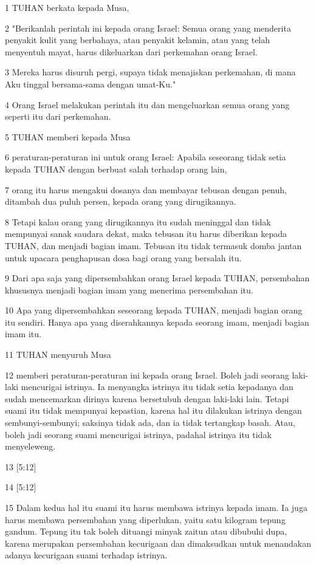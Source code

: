 \par 1 TUHAN berkata kepada Musa,
\par 2 "Berikanlah perintah ini kepada orang Israel: Semua orang yang menderita penyakit kulit yang berbahaya, atau penyakit kelamin, atau yang telah menyentuh mayat, harus dikeluarkan dari perkemahan orang Israel.
\par 3 Mereka harus disuruh pergi, supaya tidak menajiskan perkemahan, di mana Aku tinggal bersama-sama dengan umat-Ku."
\par 4 Orang Israel melakukan perintah itu dan mengeluarkan semua orang yang seperti itu dari perkemahan.
\par 5 TUHAN memberi kepada Musa
\par 6 peraturan-peraturan ini untuk orang Israel: Apabila seseorang tidak setia kepada TUHAN dengan berbuat salah terhadap orang lain,
\par 7 orang itu harus mengakui dosanya dan membayar tebusan dengan penuh, ditambah dua puluh persen, kepada orang yang dirugikannya.
\par 8 Tetapi kalau orang yang dirugikannya itu sudah meninggal dan tidak mempunyai sanak saudara dekat, maka tebusan itu harus diberikan kepada TUHAN, dan menjadi bagian imam. Tebusan itu tidak termasuk domba jantan untuk upacara penghapusan dosa bagi orang yang bersalah itu.
\par 9 Dari apa saja yang dipersembahkan orang Israel kepada TUHAN, persembahan khususnya menjadi bagian imam yang menerima persembahan itu.
\par 10 Apa yang dipersembahkan seseorang kepada TUHAN, menjadi bagian orang itu sendiri. Hanya apa yang diserahkannya kepada seorang imam, menjadi bagian imam itu.
\par 11 TUHAN menyuruh Musa
\par 12 memberi peraturan-peraturan ini kepada orang Israel. Boleh jadi seorang laki-laki mencurigai istrinya. Ia menyangka istrinya itu tidak setia kepadanya dan sudah mencemarkan dirinya karena bersetubuh dengan laki-laki lain. Tetapi suami itu tidak mempunyai kepastian, karena hal itu dilakukan istrinya dengan sembunyi-sembunyi; saksinya tidak ada, dan ia tidak tertangkap basah. Atau, boleh jadi seorang suami mencurigai istrinya, padahal istrinya itu tidak menyeleweng.
\par 13 [5:12]
\par 14 [5:12]
\par 15 Dalam kedua hal itu suami itu harus membawa istrinya kepada imam. Ia juga harus membawa persembahan yang diperlukan, yaitu satu kilogram tepung gandum. Tepung itu tak boleh dituangi minyak zaitun atau dibubuhi dupa, karena merupakan persembahan kecurigaan dan dimaksudkan untuk menandakan adanya kecurigaan suami terhadap istrinya.
